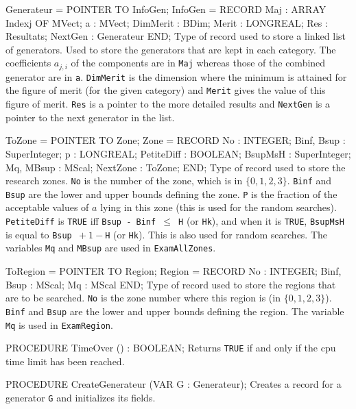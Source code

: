    Generateur = POINTER TO InfoGen;
   InfoGen    = RECORD
      Maj      : ARRAY Indexj OF MVect; 
      a        : MVect;
      DimMerit : BDim; 
      Merit    : LONGREAL;
      Res      : Resultats;
      NextGen  : Generateur
      END;
\endcode
 \tabb  Type of record used to store a linked list of generators.
   Used to store the generators that are kept in each category.
   The coefficients $a_{j,i}$ of the components are in {\tt Maj}
   whereas those of the combined generator are in {\tt a}.
   {\tt DimMerit} is the dimension where the minimum is attained for
   the figure of merit (for the given category) and {\tt Merit} gives
   the value of this figure of merit.
   {\tt Res} is a pointer to the more detailed results and
   {\tt NextGen} is a pointer to the next generator in the list.
 \endtabb
\code

   ToZone = POINTER TO Zone; 
   Zone   = RECORD
      No         : INTEGER; 
      Binf, Bsup : SuperInteger;
      p          : LONGREAL;
      PetiteDiff : BOOLEAN;
      BsupMsH    : SuperInteger;
      Mq, MBsup  : MScal;
      NextZone   : ToZone;
      END;
\endcode
 \tabb  Type of record used to store the research zones.
   {\tt No} is the number of the zone, which is in $\{0,1,2,3\}$.
   {\tt Binf} and {\tt Bsup} are the lower and upper bounds
   defining the zone.  
   {\tt P} is the fraction of the acceptable
   values of $a$ lying in this zone (this is used for the random searches).
   {\tt PetiteDiff} is {\tt TRUE} iff {\tt Bsup - Binf $\le$ H} (or {\tt Hk}),
   and when it is {\tt TRUE}, {\tt BsupMsH} is equal to 
   {\tt Bsup ${}+1-{}$H} (or {\tt Hk}). This is also used for random searches.
   The variables {\tt Mq} and {\tt MBsup} are used in {\tt ExamAllZones}.
  \endtabb
\code

   ToRegion = POINTER TO Region;
   Region   = RECORD
      No         : INTEGER;
      Binf, Bsup : MScal;
      Mq         : MScal
      END;
\endcode
 \tabb  Type of record used to store the regions that are to be searched.
   {\tt No} is the zone number where this region is (in $\{0,1,2,3\}$).
   {\tt Binf} and {\tt Bsup} are the lower and upper bounds
   defining the region.  
   The variable {\tt Mq} is  used in {\tt ExamRegion}.
  \endtabb
\code

PROCEDURE TimeOver () : BOOLEAN;
\endcode
 \tab 
   Returns {\tt TRUE} if and only if the cpu time limit has been reached.
 \endtab
\code

PROCEDURE CreateGenerateur (VAR G : Generateur);
\endcode
 \tab 
  Creates a record for a generator {\tt G} and initializes its fields.
 \endtab
\code

